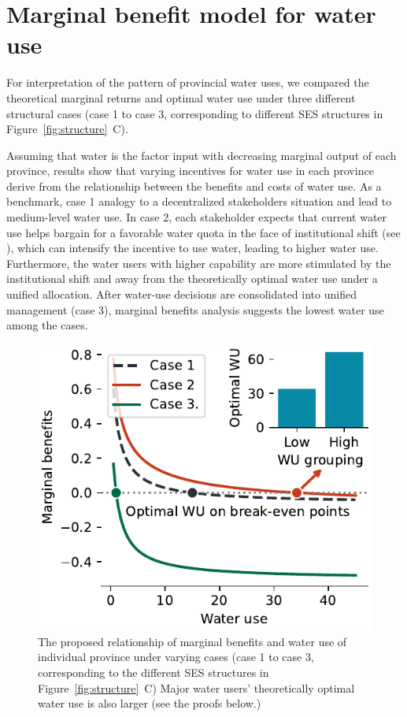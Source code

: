 \documentclass[preprint, 12pt]{elsarticle}
\providecommand{\DIFaddbegin}{} %
\providecommand{\DIFaddend}{} %
\begin{document}
\DIFaddbegin

\DIFaddend \newpage
\section{Marginal benefit model for water use}\label{secS4}
\renewcommand{\thefigure}{C\arabic{figure}}
\renewcommand{\thetable}{C\arabic{table}}
\setcounter{figure}{0}
\setcounter{table}{0}


\DIFaddbegin

\DIFaddend For interpretation of the pattern of provincial water uses, we compared the theoretical marginal returns and optimal water use under three different structural cases (case 1 to case 3, corresponding to different SES structures in Figure~\ref{fig:structure}~C).

Assuming that water is the factor input with decreasing marginal output of each province, results show that varying incentives for water use in each province derive from the relationship between the benefits and costs of water use.
As a benchmark, case 1 analogy to a decentralized stakeholders situation and lead to medium-level water use.
In case 2, each stakeholder expects that current water use helps bargain for a favorable water quota in the face of institutional shift (see \textit{}), which can intensify the incentive to use water, leading to higher water use.
Furthermore, the water users with higher capability are more stimulated by the institutional shift and away from the theoretically optimal water use under a unified allocation.
After water-use decisions are consolidated into unified management (case 3), marginal benefits analysis suggests the lowest water use among the cases.


\begin{figure}[!htb]
	\centering
	\includegraphics[width=0.6\linewidth]{outputs/economic_model.pdf}
	\caption{
		The proposed relationship of marginal benefits and water use of individual province under varying cases (case 1 to case 3, corresponding to the different SES structures in Figure~\ref{fig:structure}~C) Major water users' theoretically optimal water use is also larger (see the proofs below.)}
\end{figure}
\end{document}
